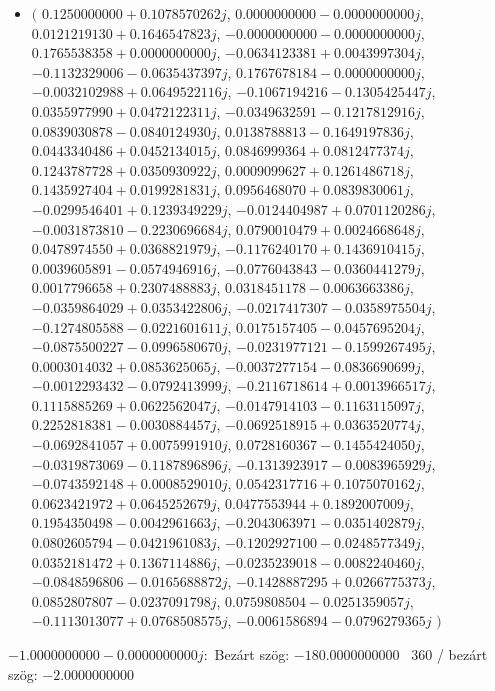 \documentclass[14pt,a4paper]{article}
\begin{document}
\begin{itemize}
\item
$\big($
$0.1250000000+0.1078570262j$, $0.0000000000-0.0000000000j$, $0.0121219130+0.1646547823j$, $-0.0000000000-0.0000000000j$, $0.1765538358+0.0000000000j$, $-0.0634123381+0.0043997304j$, $-0.1132329006-0.0635437397j$, $0.1767678184-0.0000000000j$, $-0.0032102988+0.0649522116j$, $-0.1067194216-0.1305425447j$, $0.0355977990+0.0472122311j$, $-0.0349632591-0.1217812916j$, $0.0839030878-0.0840124930j$, $0.0138788813-0.1649197836j$, $0.0443340486+0.0452134015j$, $0.0846999364+0.0812477374j$, $0.1243787728+0.0350930922j$, $0.0009099627+0.1261486718j$, $0.1435927404+0.0199281831j$, $0.0956468070+0.0839830061j$, $-0.0299546401+0.1239349229j$, $-0.0124404987+0.0701120286j$, $-0.0031873810-0.2230696684j$, $0.0790010479+0.0024668648j$, $0.0478974550+0.0368821979j$, $-0.1176240170+0.1436910415j$, $0.0039605891-0.0574946916j$, $-0.0776043843-0.0360441279j$, $0.0017796658+0.2307488883j$, $0.0318451178-0.0063663386j$, $-0.0359864029+0.0353422806j$, $-0.0217417307-0.0358975504j$, $-0.1274805588-0.0221601611j$, $0.0175157405-0.0457695204j$, $-0.0875500227-0.0996580670j$, $-0.0231977121-0.1599267495j$, $0.0003014032+0.0853625065j$, $-0.0037277154-0.0836690699j$, $-0.0012293432-0.0792413999j$, $-0.2116718614+0.0013966517j$, $0.1115885269+0.0622562047j$, $-0.0147914103-0.1163115097j$, $0.2252818381-0.0030884457j$, $-0.0692518915+0.0363520774j$, $-0.0692841057+0.0075991910j$, $0.0728160367-0.1455424050j$, $-0.0319873069-0.1187896896j$, $-0.1313923917-0.0083965929j$, $-0.0743592148+0.0008529010j$, $0.0542317716+0.1075070162j$, $0.0623421972+0.0645252679j$, $0.0477553944+0.1892007009j$, $0.1954350498-0.0042961663j$, $-0.2043063971-0.0351402879j$, $0.0802605794-0.0421961083j$, $-0.1202927100-0.0248577349j$, $0.0352181472+0.1367114886j$, $-0.0235239018-0.0082240460j$, $-0.0848596806-0.0165688872j$, $-0.1428887295+0.0266775373j$, $0.0852807807-0.0237091798j$, $0.0759808504-0.0251359057j$, $-0.1113013077+0.0768508575j$, $-0.0061586894-0.0796279365j$
$\big)$
\end{itemize}
$-1.0000000000-0.0000000000j$:\
Bezárt szög: $-180.0000000000$ \
360 / bezárt szög: $-2.0000000000$\
\end{document}
